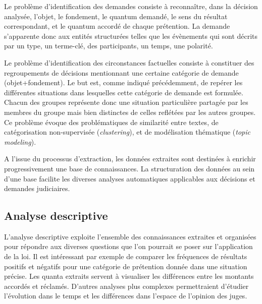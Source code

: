 Le problème d'identification des demandes consiste à reconnaître, dans la décision analysée, l'objet, le fondement, le quantum demandé, le sens du résultat correspondant, et le quantum accordé de chaque prétention. La demande s'apparente donc aux entités structurées telles que les évènements \cite{ace2005event} qui sont décrits par un type, un terme-clé, des participants, un temps, une polarité.

Le problème d'identification des circonstances factuelles consiste à constituer des regroupements de décisions mentionnant une certaine catégorie de demande (objet+fondement). Le but est, comme indiqué précédemment, de repérer les différentes situations dans lesquelles cette catégorie de demande est formulée. Chacun des groupes représente donc une situation particulière partagée par les membres du groupe mais bien distinctes de celles reflétées par les autres groupes. Ce problème évoque des problématiques de similarité entre textes, de catégorisation non-supervisée (\textit{clustering}), et de \og modélisation thématique \fg{} (\textit{topic modeling}). 

A l'issue du processus d'extraction, les données extraites sont destinées à enrichir progressivement une base de connaissances. La structuration des données au sein d'une base facilite les diverses analyses automatiques applicables aux décisions et demandes judiciaires. 

\subsection{Analyse descriptive}
L'analyse descriptive exploite l'ensemble des connaissances extraites et organisées pour répondre aux diverses questions que l'on pourrait se poser sur l'application de la loi. Il est intéressant par exemple de comparer les fréquences de résultats positifs et négatifs pour une catégorie de prétention donnée dans une situation précise. Les quanta extraits servent à visualiser les différences entre les montants accordés et réclamés. D'autres analyses plus complexes permettraient d'étudier l'évolution dans le temps et les différences dans l'espace de l'opinion des juges.


